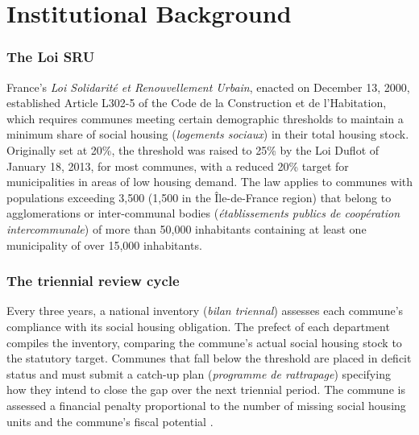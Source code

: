 \documentclass[12pt]{article}
\begin{document}
\section{Institutional Background}

\subsubsection*{The Loi SRU} France's \textit{Loi Solidarit\'{e} et Renouvellement Urbain}, enacted on December 13, 2000, established Article L302-5 of the Code de la Construction et de l'Habitation, which requires communes meeting certain demographic thresholds to maintain a minimum share of social housing (\textit{logements sociaux}) in their total housing stock. Originally set at 20\%, the threshold was raised to 25\% by the Loi Duflot of January 18, 2013, for most communes, with a reduced 20\% target for municipalities in areas of low housing demand. The law applies to communes with populations exceeding 3,500 (1,500 in the \^{I}le-de-France region) that belong to agglomerations or inter-communal bodies (\textit{\'{e}tablissements publics de coop\'{e}ration intercommunale}) of more than 50,000 inhabitants containing at least one municipality of over 15,000 inhabitants.

\subsubsection*{The triennial review cycle} Every three years, a national inventory (\textit{bilan triennal}) assesses each commune's compliance with its social housing obligation. The prefect of each department compiles the inventory, comparing the commune's actual social housing stock to the statutory target. Communes that fall below the threshold are placed in deficit status and must submit a catch-up plan (\textit{programme de rattrapage}) specifying how they intend to close the gap over the next triennial period. The commune is assessed a financial penalty proportional to the number of missing social housing units and the commune's fiscal potential \citep{minist2020}.
\end{document}
